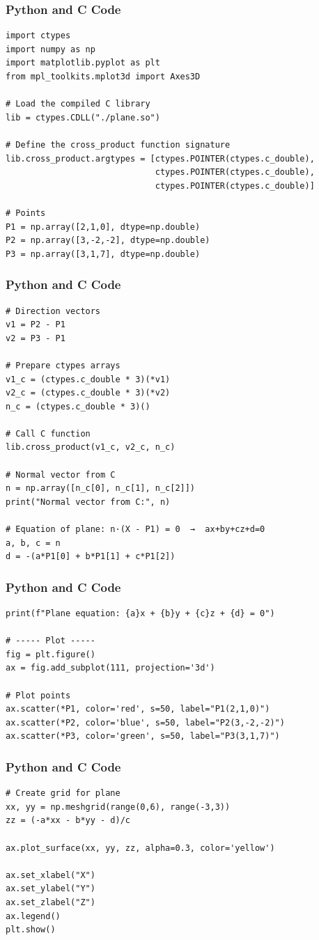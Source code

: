\documentclass{beamer}
\begin{document}
\begin{frame}[fragile]
\frametitle{Python and C Code}

\begin{lstlisting}
import ctypes
import numpy as np
import matplotlib.pyplot as plt
from mpl_toolkits.mplot3d import Axes3D

# Load the compiled C library
lib = ctypes.CDLL("./plane.so")

# Define the cross_product function signature
lib.cross_product.argtypes = [ctypes.POINTER(ctypes.c_double),
                              ctypes.POINTER(ctypes.c_double),
                              ctypes.POINTER(ctypes.c_double)]

# Points
P1 = np.array([2,1,0], dtype=np.double)
P2 = np.array([3,-2,-2], dtype=np.double)
P3 = np.array([3,1,7], dtype=np.double)
\end{lstlisting}

\end{frame}
\begin{frame}[fragile]
\frametitle{Python and C Code}

\begin{lstlisting}
# Direction vectors
v1 = P2 - P1
v2 = P3 - P1

# Prepare ctypes arrays
v1_c = (ctypes.c_double * 3)(*v1)
v2_c = (ctypes.c_double * 3)(*v2)
n_c = (ctypes.c_double * 3)()

# Call C function
lib.cross_product(v1_c, v2_c, n_c)

# Normal vector from C
n = np.array([n_c[0], n_c[1], n_c[2]])
print("Normal vector from C:", n)

# Equation of plane: n·(X - P1) = 0  →  ax+by+cz+d=0
a, b, c = n
d = -(a*P1[0] + b*P1[1] + c*P1[2])
\end{lstlisting}

\end{frame}
\begin{frame}[fragile]
\frametitle{Python and C Code}

\begin{lstlisting}
print(f"Plane equation: {a}x + {b}y + {c}z + {d} = 0")

# ----- Plot -----
fig = plt.figure()
ax = fig.add_subplot(111, projection='3d')

# Plot points
ax.scatter(*P1, color='red', s=50, label="P1(2,1,0)")
ax.scatter(*P2, color='blue', s=50, label="P2(3,-2,-2)")
ax.scatter(*P3, color='green', s=50, label="P3(3,1,7)")
\end{lstlisting}

\end{frame}
\begin{frame}[fragile]
\frametitle{Python and C Code}

\begin{lstlisting}
# Create grid for plane
xx, yy = np.meshgrid(range(0,6), range(-3,3))
zz = (-a*xx - b*yy - d)/c

ax.plot_surface(xx, yy, zz, alpha=0.3, color='yellow')

ax.set_xlabel("X")
ax.set_ylabel("Y")
ax.set_zlabel("Z")
ax.legend()
plt.show()
\end{lstlisting}

\end{frame}
\end{document}
